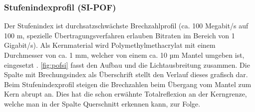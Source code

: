 \subsubsection{Stufenindexprofil (SI-POF)}

Der Stufenindex ist durchsatzschwächste Brechzahlprofil (ca. 100 Megabit/s auf
100 m, spezielle Übertragungsverfahren erlauben Bitraten im Bereich von 1
Gigabit/s). Als Kernmaterial wird Polymethylmethacrylat mit einem Durchmesser
von ca. 1 mm, welcher von einem ca. 10 µm Mantel umgeben ist, eingesetzt
\cite{pofacsi}. \autoref{fig:pofsi} fasst den Aufbau und die Lichtausbreitung
zusammen. Die Spalte mit Brechungsindex als Überschrift stellt den Verlauf
dieses grafisch dar. Beim Stufenindexprofil steigen die Brechzahlen beim
Übergang vom Mantel zum Kern abrupt an. Dies hat die schon erwähnte
Totalreflexion an der Kerngrenze, welche man in der Spalte Querschnitt erkennen
kann, zur Folge.

